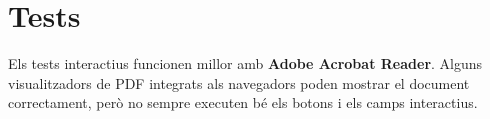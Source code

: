 \documentclass[12pt,a4paper,oneside]{book}
\begin{document}
\let\cleardoublepage\clearpage
\mainmatter




\chapter{Tests}
\label{cap:tests}

\begin{observacio}
Els tests interactius funcionen millor amb \textbf{Adobe Acrobat Reader}. Alguns visualitzadors de PDF integrats als navegadors poden mostrar el document correctament, però no sempre executen bé els botons i els camps interactius.
\end{observacio}

\begin{Form}



\end{Form}

\backmatter
\end{document}
